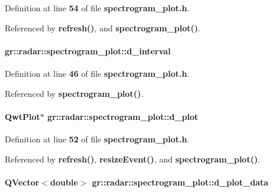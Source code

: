 Definition at line {\bf 54} of file {\bf spectrogram\+\_\+plot.\+h}.



Referenced by {\bf refresh()}, and {\bf spectrogram\+\_\+plot()}.

\paragraph[{d\+\_\+interval}]{ gr\+::radar\+::spectrogram\+\_\+plot\+::d\+\_\+interval\hspace{0.3cm}{\ttfamily [private]}}\label{classgr_1_1radar_1_1spectrogram__plot_ac13c157cc84b55c993e5dcb6c545fd1a}


Definition at line {\bf 46} of file {\bf spectrogram\+\_\+plot.\+h}.



Referenced by {\bf spectrogram\+\_\+plot()}.

\paragraph[{d\+\_\+plot}]{\setlength{\rightskip}{0pt plus 5cm}Qwt\+Plot$\ast$ gr\+::radar\+::spectrogram\+\_\+plot\+::d\+\_\+plot\hspace{0.3cm}{\ttfamily [private]}}\label{classgr_1_1radar_1_1spectrogram__plot_a884088fb54cc6282cda362b9cde86d20}


Definition at line {\bf 52} of file {\bf spectrogram\+\_\+plot.\+h}.



Referenced by {\bf refresh()}, {\bf resize\+Event()}, and {\bf spectrogram\+\_\+plot()}.

\paragraph[{d\+\_\+plot\+\_\+data}]{\setlength{\rightskip}{0pt plus 5cm}Q\+Vector$<$double$>$ gr\+::radar\+::spectrogram\+\_\+plot\+::d\+\_\+plot\+\_\+data\hspace{0.3cm}{\ttfamily [private]}}\label{classgr_1_1radar_1_1spectrogram__plot_a04379900b4f34839a6488fbeba9a3774}



